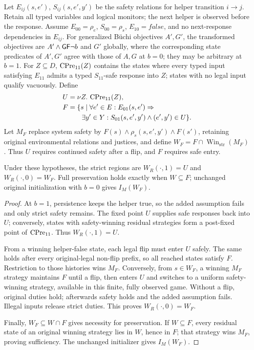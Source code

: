 Let $E_{ij}(s,e')$, $S_{ij}(s,e',y')$ be the safety relations for helper
transition $i\to j$. Retain all typed variables and logical monitors;
the next helper is observed before the response. Assume
$E_{00}=\rho_e$, $S_{00}=\rho_s$, $E_{10}=\mathit{false}$, and no
next-response dependencies in $E_{ij}$. For generalized B\"uchi objectives
$A',G'$, the transformed objectives are $A'\land\mathsf{G}\mathsf{F}\neg b$ and $G'$ globally, where the corresponding
state predicates of $A',G'$ agree with those of $A,G$ at $b=0$;
they may be arbitrary at $b=1$.
For $Z\subseteq D$, $\operatorname{CPre}_{11}(Z)$ contains the states where every
typed input satisfying $E_{11}$ admits a typed $S_{11}$-safe response
into $Z$; states with no legal input qualify vacuously. Define
\[
\begin{aligned}
U&=\nu Z.\,\operatorname{CPre}_{11}(Z),\\
F&=\{s\mid\forall e'\in E:E_{01}(s,e')\Rightarrow{}\\
 &\qquad\exists y'\in Y:S_{01}(s,e',y')\land(e',y')\in U\}.
\end{aligned}
\]
Let $M_F$ replace system safety by $F(s)\land\rho_s(s,e',y')\land F(s')$,
retaining original environmental relations and justices, and define
$W_F=F\cap\operatorname{Win}_{\mathrm{str}}(M_F)$.
Thus $U$ requires continued safety after a flip, and $F$ requires safe entry.
\begin{proposition}\label{hpb:retained}
Under these hypotheses,
the strict regions are $W_R(\cdot,1)=U$ and $W_R(\cdot,0)=W_F$.
Full preservation holds exactly when $W\subseteq F$; unchanged original
initialization with $b=0$ gives $I_M(W_F)$.
\end{proposition}

\begin{proof}
At $b=1$, persistence keeps the helper true, so the added assumption
fails and only strict safety remains. The fixed point $U$ supplies safe
responses back into $U$; conversely, states with safety-winning residual
strategies form a post-fixed point of $\operatorname{CPre}_{11}$. Thus $W_R(\cdot,1)=U$.

From a winning helper-false state, each legal flip must enter $U$ safely.
The same holds after every original-legal non-flip prefix, so all reached
states satisfy $F$. Restriction to those histories wins $M_F$.
Conversely, from $s\in W_F$, a winning $M_F$ strategy maintains $F$ until a flip, then
enters $U$ and switches to a uniform safety-winning strategy, available
in this finite, fully observed game. Without a flip, original duties
hold; afterwards safety holds and the added assumption fails. Illegal
inputs release strict duties. This proves $W_R(\cdot,0)=W_F$.

Finally, $W_F\subseteq W\cap F$ gives necessity for preservation.
If $W\subseteq F$, every residual state of an original winning strategy
lies in $W$, hence in $F$; that strategy wins $M_F$, proving sufficiency.
The unchanged initializer gives $I_M(W_F)$.
\end{proof}

